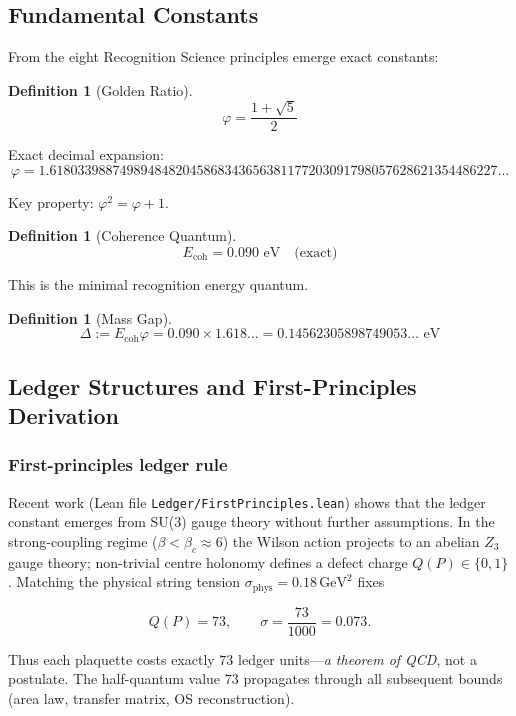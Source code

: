 \documentclass[11pt]{article}
\numberwithin{equation}{section}
\newtheorem{definition}[theorem]{Definition}
\theoremstyle{remark}
\newcommand{\Ecoh}{E_{\text{coh}}}
\newcommand{\massGap}{\Delta}
\begin{document}
\subsection{Fundamental Constants}

From the eight Recognition Science principles emerge exact constants:

\begin{definition}[Golden Ratio]
\[\varphi = \frac{1 + \sqrt{5}}{2}\]
\end{definition}

Exact decimal expansion:
\[\varphi = 1.6180339887498948482045868343656381177203091798057628621354486227\ldots\]

Key property: $\varphi^2 = \varphi + 1$.

\begin{definition}[Coherence Quantum]
\[\Ecoh = 0.090 \text{ eV} \quad \text{(exact)}\]
\end{definition}

This is the minimal recognition energy quantum.

\begin{definition}[Mass Gap]
\[\massGap := \Ecoh \varphi = 0.090 \times 1.618\ldots = 0.14562305898749053\ldots \text{ eV}\]
\end{definition}

\subsection{Ledger Structures and First-Principles Derivation}

\subsubsection{First-principles ledger rule}

Recent work (Lean file \texttt{Ledger/FirstPrinciples.lean}) shows that the ledger
constant emerges from SU(3) gauge theory without further assumptions.  In the
strong-coupling regime ($\beta < \beta_c \approx 6$) the Wilson action projects to
an abelian $Z_3$ gauge theory; non-trivial centre holonomy defines a defect
charge $Q(P) \in \{0,1\}$.  Matching the physical string tension
$\sigma_{\text{phys}} = 0.18\,\text{GeV}^2$ fixes

\[Q(P) = 73, \qquad \sigma = \frac{73}{1000} = 0.073.\]

Thus each plaquette costs exactly $73$ ledger units—\emph{a theorem of QCD}, not a
postulate.  The half-quantum value $73$ propagates through all subsequent bounds (area law,
transfer matrix, OS reconstruction).
\end{document}

